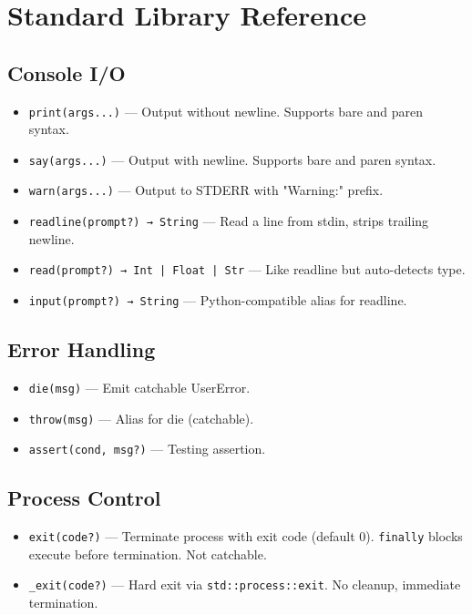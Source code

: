 \section{Standard Library Reference}

\subsection{Console I/O}
\begin{itemize}
    \item \texttt{print(args...)} — Output without newline. Supports bare and paren syntax.
    \item \texttt{say(args...)} — Output with newline. Supports bare and paren syntax.
    \item \texttt{warn(args...)} — Output to STDERR with "Warning:" prefix.
    \item \texttt{readline(prompt?) → String} — Read a line from stdin, strips trailing newline.
    \item \texttt{read(prompt?) → Int | Float | Str} — Like readline but auto-detects type.
    \item \texttt{input(prompt?) → String} — Python-compatible alias for readline.
\end{itemize}

\subsection{Error Handling}
\begin{itemize}
    \item \texttt{die(msg)} — Emit catchable UserError.
    \item \texttt{throw(msg)} — Alias for die (catchable).
    \item \texttt{assert(cond, msg?)} — Testing assertion.
\end{itemize}

\subsection{Process Control}
\begin{itemize}
    \item \texttt{exit(code?)} — Terminate process with exit code (default 0). \texttt{finally} blocks execute before termination. Not catchable.
    \item \texttt{\_exit(code?)} — Hard exit via \texttt{std::process::exit}. No cleanup, immediate termination.
\end{itemize}

